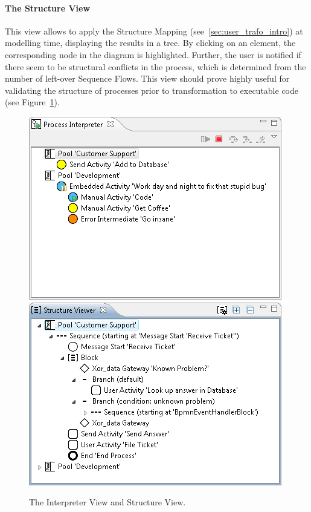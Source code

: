 \paragraph*{The Structure View}
\label{sec:user_perspective_strucView}
This view allows to apply the Structure Mapping (see~\ref{sec:user_trafo_intro})
at modelling time, displaying the results in a tree.  By clicking on an element,
the corresponding node in the diagram is highlighted.  Further, the user is
notified if there seem to be structural conflicts in the process, which is
determined from the number of left-over Sequence Flows.  This view should prove
highly useful for validating the structure of processes prior to transformation
to executable code (see Figure~\ref{fig:customViews2}).

\begin{figure}[t]
	\centering
	\includegraphics[width=.4\textwidth]{figures/features/interpreterView.png}
	\hspace{.5cm}
	\includegraphics[width=.4\textwidth]{figures/features/structureView.png}
	\caption{The Interpreter View and Structure View.}
	\label{fig:customViews2}
\end{figure}

